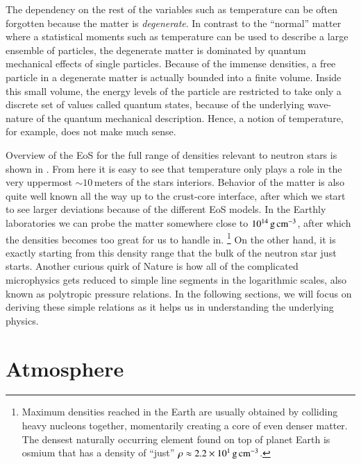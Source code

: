 The dependency on the rest of the variables such as temperature can be often forgotten because the matter is \emph{degenerate}.%
In contrast to the ``normal'' matter where a statistical moments such as temperature can be used to describe a large ensemble of particles, the degenerate matter is dominated by quantum mechanical effects of single particles.
Because of the immense densities, a free particle in a degenerate matter is actually bounded into a finite volume.
Inside this small volume, the energy levels of the particle are restricted to take only a discrete set of values called quantum states, because of the underlying wave-nature of the quantum mechanical description.
Hence, a notion of temperature, for example, does not make much sense.

Overview of the EoS for the full range of densities relevant to neutron stars is shown in .
From here it is easy to see that temperature only plays a role in the very uppermost $\sim 10\,\mathrm{meters}$ of the stars interiors.
Behavior of the matter is also quite well known all the way up to the crust-core interface, after which we start to see larger deviations because of the different EoS models.
In the Earthly laboratories we can probe the matter somewhere close to $10^{14} \, \mathrm{g}\,\mathrm{cm}^{-3}$, after which the densities becomes too great for us to handle in.%
\footnote{Maximum densities reached in the Earth are usually obtained by colliding heavy nucleons together, momentarily creating a core of even denser matter.
The densest naturally occurring element found on top of planet Earth is osmium that has a density of ``just'' $\rho \approx 2.2 \times 10^{1}\, \mathrm{g}\,\mathrm{cm}^{-3}$.
}
On the other hand, it is exactly starting from this density range that the bulk of the neutron star just starts.
Another curious quirk of Nature is how all of the complicated microphysics gets reduced to simple line segments in the logarithmic scales, also known as polytropic pressure relations.
In the following sections, we will focus on deriving these simple relations as it helps us in understanding the underlying physics.

\section{Atmosphere}\label{sect:atmos}

